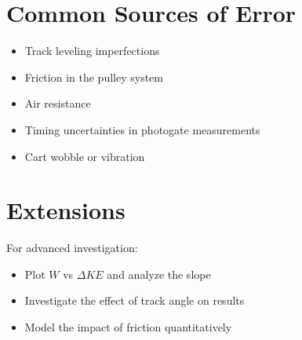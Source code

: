 \documentclass[12pt]{article}
\begin{document}
\section{Common Sources of Error}

\begin{itemize}
\item Track leveling imperfections
\item Friction in the pulley system
\item Air resistance
\item Timing uncertainties in photogate measurements
\item Cart wobble or vibration
\end{itemize}

\section{Extensions}

For advanced investigation:
\begin{itemize}
\item Plot $W$ vs $\Delta KE$ and analyze the slope
\item Investigate the effect of track angle on results
\item Model the impact of friction quantitatively
\end{itemize}
\end{document}
